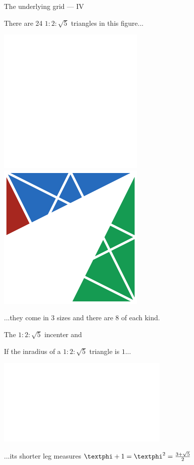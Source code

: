 \documentclass[14pt]{beamer}
\begin{document}
    \begin{frame}{The underlying grid --- IV}
        \begin{center}
            There are 24 $1\!\!:\!\!2\!\!:\!\!\sqrt{5}$ triangles in this figure...

            \bigskip \bigskip

            \includegraphics[height=18ex]{figures/figure002b.pdf}\qquad
            \includegraphics[height=18ex]{figures/figure002d.pdf}\\

            \bigskip \bigskip

            ...they come in 3 sizes and there are 8 of each kind.
        \end{center}
    \end{frame}


    \begin{frame}{The $1\!\!:\!\!2\!\!:\!\!\sqrt{5}$ incenter and}
        \begin{center}
            If the inradius of a $1\!\!:\!\!2\!\!:\!\!\sqrt{5}$ triangle is $1$...

            \bigskip \bigskip

            \includegraphics[height=18ex]{figures/figure006a.pdf}

            \bigskip \bigskip

            ...its shorter leg measures $\text{\textphi}+1 = \text{\textphi}^2 = \frac{3+\sqrt{5}}{2}$
        \end{center}
    \end{frame}
\end{document}
